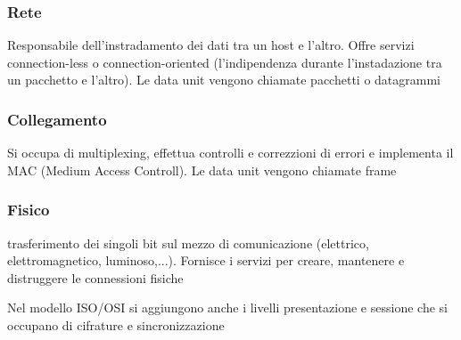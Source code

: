 \documentclass[12pt, a4paper]{article}
\begin{document}
\subsubsection*{Rete}
Responsabile dell'instradamento dei dati tra un host e l'altro. Offre servizi connection-less o connection-oriented 
(l'indipendenza durante l'instadazione tra un pacchetto e l'altro). Le data unit vengono chiamate pacchetti o datagrammi
\subsubsection*{Collegamento}
Si occupa di multiplexing, effettua controlli e correzzioni di errori e implementa il MAC (Medium Access Controll).
Le data unit vengono chiamate frame
\subsubsection*{Fisico}
trasferimento dei singoli bit sul mezzo di comunicazione (elettrico, elettromagnetico, luminoso,...). Fornisce i servizi per
creare, mantenere e distruggere le connessioni fisiche

Nel modello ISO/OSI si aggiungono anche i livelli presentazione e sessione che si occupano di cifrature e 
sincronizzazione
\end{document}
